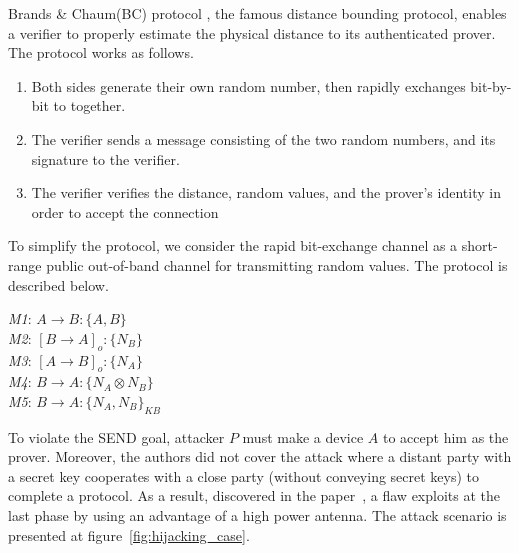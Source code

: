 Brands \& Chaum(BC) protocol \cite{Brands:1994aa}, the famous distance bounding protocol, enables a verifier to properly estimate the physical distance to its authenticated prover. The protocol works as follows.
\begin{enumerate}
\item Both sides generate their own random number, then rapidly exchanges bit-by-bit to together.
\item The verifier sends a message consisting of the two random numbers, and its signature to the verifier. 
\item The verifier verifies the distance, random values, and the prover's identity in order to accept the connection
\end{enumerate}

To simplify the protocol, we consider the rapid bit-exchange channel as a short-range public out-of-band channel for transmitting random values. The protocol is described below. 

\begin{center}
\begin{flushleft}
 \emph{M1}: $A \rightarrow B :\{A,B\}$ \\
\emph{M2}: $[B \rightarrow A]_o :\{N_B\}$ \\
\emph{M3}: $[A \rightarrow B]_o : \{N_A\}$\\
\emph{M4}: $B \rightarrow A :\{N_A \otimes N_B\}$ \\
\emph{M5}: $B \rightarrow A : \{N_A,N_B\}_{KB}$
\end{flushleft}
\end{center}

To violate the SEND goal, attacker $P$ must make a device $A$ to accept him as the prover. Moreover, the authors did not cover the attack where a distant party with a secret key cooperates with a close party (without conveying secret keys) to complete a protocol. As a result, discovered in the paper~\cite{6234408}, a flaw exploits at the last phase by using an advantage of a high power antenna. The attack scenario is presented at figure~\ref{fig:hijacking_case}. 

